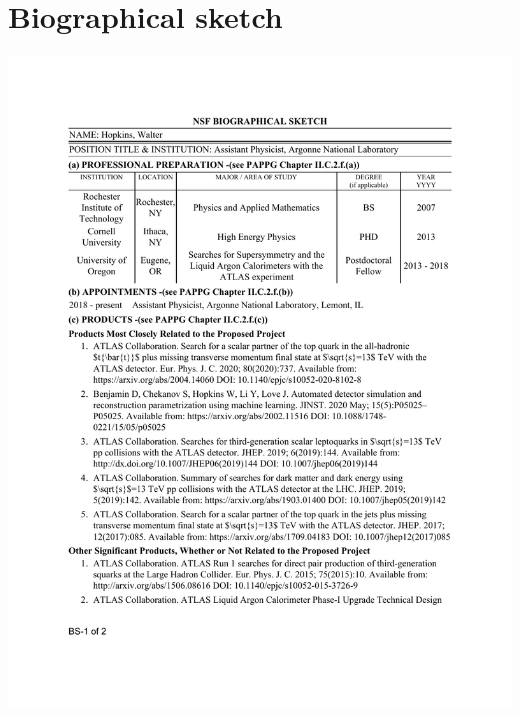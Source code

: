 \documentclass[letter, USenglish, 11pt, subfigure]{article}
\begin{document}
\section{Biographical sketch}
\centerline{\includegraphics[width=0.99\paperwidth,trim=0 1.73in 0 1.06in,clip]{bioSketch.pdf}}


\clearpage

% 
% 

\printbibliography[title={Bibliography and References},heading=bibnumbered]
\clearpage
\end{document}
